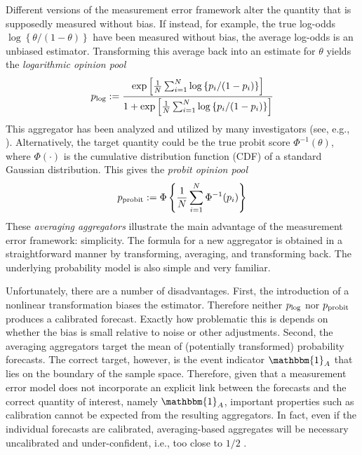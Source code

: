 \documentclass[12pt]{article}
\theoremstyle{definition}
\theoremstyle{definition}
\def\one{\mathbbm{1}}
\def\probit{p_{\rm probit}}
\def\plog{p_{\rm log}}
\begin{document}
Different versions of the measurement error framework alter the quantity that is supposedly
measured without bias. If instead, for example, the true log-odds
$\log\left\{\theta/(1-\theta)\right\}$ have been measured without
bias, the average log-odds is an unbiased estimator. Transforming
this average back into an estimate for $\theta$ yields the {\em
logarithmic opinion pool}
$$\plog := \frac{\exp \left [ \frac{1}{N} \sum_{i=1}^N
   \log \left\{ p_i / (1-p_i) \right\} \right ]} {1 + \exp \left [
\frac{1}{N} \sum_{i=1}^N \log \left\{p_i / (1-p_i)\right\} \right
]} $$ This aggregator has been analyzed and utilized by many
investigators (see, e.g., \citealt{dawid1995coherent, Genest,
bacharach1975group}). Alternatively, the target quantity could be
the true probit score $\Phi^{-1}(\theta)$, where $\Phi(\cdot)$ is the
cumulative distribution function (CDF) of a standard Gaussian
distribution. This gives the {\em probit opinion pool}
$$\probit := \Phi \left\{ \frac{1}{N} \sum_{i=1}^N \Phi^{-1}
   (p_i) \right \} $$
These \textit{averaging aggregators} illustrate the main advantage of the measurement
error framework: simplicity.  The formula for a new aggregator is
obtained in a straightforward manner by transforming, averaging, and
transforming back.  The underlying probability model is also simple
and very familiar.  

Unfortunately, there are a number of disadvantages. First, the introduction of a nonlinear transformation biases the
estimator.  Therefore neither $\plog$ nor $\probit$ produces a
calibrated forecast. Exactly how problematic this is depends on
whether the bias is small relative to noise or other
adjustments. Second, the averaging aggregators target the mean of
(potentially transformed) probability forecasts. The correct target,
however, is the event indicator $\one_A$ that lies on the boundary of
the sample space. Therefore, given that a measurement error model does not incorporate an explicit link between the forecasts and the correct quantity of interest, namely $\one_A$, important properties such as calibration cannot be expected from the resulting aggregators. In fact, even if the individual forecasts are calibrated, averaging-based aggregates will be necessary uncalibrated and under-confident, i.e., too close to $1/2$ \citep{Ranjan08}.
\end{document}
